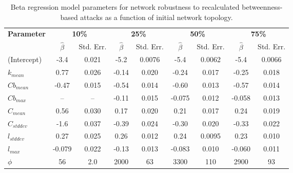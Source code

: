 \begin{table}[!htp]
\scriptsize
\centering

\begin{tabular}{lcccccccc}
\toprule
\multirow{2}{*}{\textbf{Parameter}} & \multicolumn{2}{c}{\textbf{10\%}} & \multicolumn{2}{c}{\textbf{25\%}} & \multicolumn{2}{c}{\textbf{50\%}} & \multicolumn{2}{c}{\textbf{75\%}}\\
 & $\hat{\beta}$ & Std. Err. & $\hat{\beta}$ & Std. Err. & $\hat{\beta}$ & Std. Err. & $\hat{\beta}$ & Std. Err. \\
\midrule

(Intercept) & -3.4 & 0.021 & -5.2 & 0.0076 & -5.4 & 0.0062 & -5.4 & 0.0066 \\
$k_{mean}$ & 0.77 & 0.026 & -0.14 & 0.020 & -0.24 & 0.017 & -0.25 & 0.018 \\
$Cb_{mean}$ & -0.47 & 0.015 & -0.54 & 0.014 & -0.60 & 0.013 & -0.57 & 0.014 \\
$Cb_{max}$ & -- & -- & -0.11 & 0.015 & -0.075 & 0.012 & -0.058 & 0.013 \\
$C_{mean}$ & 0.56 & 0.030 & 0.17 & 0.020 & 0.21 & 0.017 & 0.24 & 0.019 \\
$C_{std dev}$ & -1.6 & 0.037 & -0.39 & 0.024 & -0.30 & 0.020 & -0.33 & 0.022 \\
$l_{std dev}$ & 0.27 & 0.025 & 0.26 & 0.012 & 0.24 & 0.0095 & 0.23 & 0.010 \\
$l_{max}$ & -0.079 & 0.022 & -0.13 & 0.013 & -0.083 & 0.010 & -0.060 & 0.011 \\
$\phi$ & 56 & 2.0 & 2000 & 63 & 3300 & 110 & 2900 & 93 \\

\bottomrule

\end{tabular}

\caption[Beta regression model parameters for network robustness to recalculated betweenness-based attacks.]{\label{tab:ch2:betaregNBr}Beta regression model parameters for network robustness to recalculated betweenness-based attacks as a function of initial network topology.}
\end{table}



